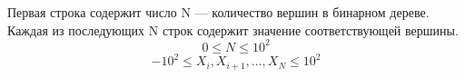 Первая строка содержит число N --- количество вершин в бинарном дереве. Каждая из последующих N строк содержит значение соответствующей вершины.
\vspace{1em}
$$0\le N\le 10^2$$
$$-10^{2}\le X_i, X_{i+1}, \ldots, X_N\le 10^2$$
